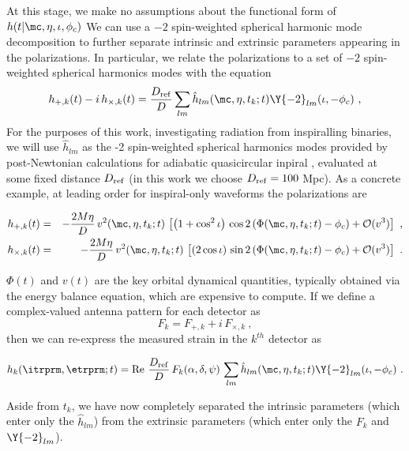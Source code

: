 At this stage, we make no assumptions about the functional form of $h(t|\mc,\eta,\iota,\phi_c)$
%
We can use a $-2$ spin-weighted spherical harmonic mode decomposition to further separate intrinsic and extrinsic
parameters appearing in the polarizations. 
In particular, we relate the polarizations to a set of $-2$ spin-weighted 
spherical harmonics modes with the equation
\begin{equation} \label{eq:h:Expansion}
h_{+,k}(t) - i\,h_{\times,k}(t) = \frac{D_{\rm ref}}{D} \sum_{lm} \hat{h}_{lm}(\mc,\eta,t_k;t)  \Y{-2}_{lm}(\iota,-\phi_c) \ ,
\end{equation}
For the purposes of this work, investigating radiation from inspiralling binaries, we will use $\hat{h}_{lm}$ as the -2
spin-weighted spherical harmonics modes provided by post-Newtonian calculations for adiabatic quasicircular inpiral \cite{gw-astro-mergers-approximations-SpinningPNHigherHarmonics},
evaluated at some fixed distance $D_{\rm ref}$ (in this work we choose $D_{\rm ref} = 100$ Mpc).
%
As a concrete example, at leading order for inspiral-only waveforms the polarizations are
\begin{widetext}
\begin{eqnarray} \label{eq:polarizations}
h_{+,k}(t) &=& - \frac{2 M \eta}{D}\,v^2(\mc,\eta,t_k;t)\,\left[ \left( 1 + \cos^2 \iota \right)\, \label{eq:h+}
	\cos 2 \left( \Phi(\mc,\eta,t_k;t) - \phi_c \right) + {\cal O}(v^3)\right]\ ,\\
h_{\times,k}(t) &=& - \frac{2 M \eta}{D}\,v^2(\mc,\eta,t_k;t)\,\left[ \left( 2 \cos \iota\right)\, \label{eq:hx}
	\sin 2 \left( \Phi(\mc,\eta,t_k;t) - \phi_c \right) + {\cal O}(v^3)\right]\ .
\end{eqnarray}
\end{widetext}
$\Phi(t)$ and $v(t)$ are the key orbital dynamical quantities, typically obtained via the energy balance equation,
which are expensive to compute.
%
If we define a complex-valued antenna pattern for each detector as
\begin{equation} \label{eq:complexF}
F_k = F_{+,k} + i \, F_{\times,k} \ ,
\end{equation}
then we can re-express the measured strain in the $k^{th}$ detector as
\begin{widetext}
\begin{equation} \label{eq:decomposed_strain}
h_k(\itrprm,\etrprm;t) = {\rm Re}\ \frac{D_{\rm ref}}{D}\, F_k(\alpha,\delta,\psi) \, \sum_{lm} 
\hat{h}_{lm}(\mc,\eta,t_k;t)  \Y{-2}_{lm}(\iota,-\phi_c)\ .
\end{equation}
\end{widetext}
Aside from $t_k$, we have now completely separated the intrinsic parameters (which enter only the $\hat{h}_{lm}$)
from the extrinsic parameters (which enter only the $F_k$ and $\Y{-2}_{lm}$).

